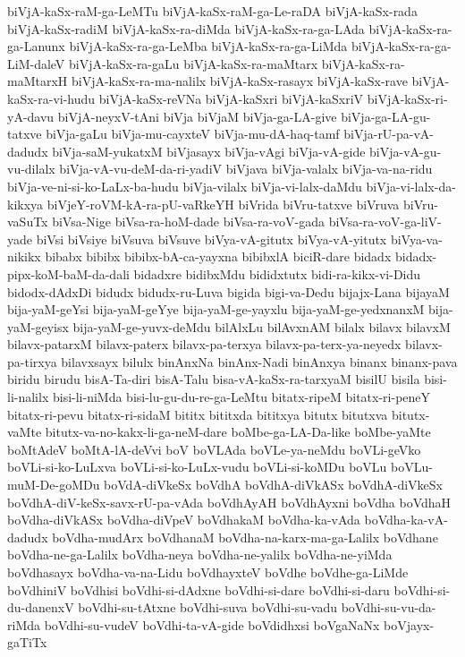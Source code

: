{biVjA-kaSx-raM-ga-LeMTu
biVjA-kaSx-raM-ga-Le-raDA
biVjA-kaSx-rada
biVjA-kaSx-radiM
biVjA-kaSx-ra-diMda
biVjA-kaSx-ra-ga-LAda
biVjA-kaSx-ra-ga-Lanunx
biVjA-kaSx-ra-ga-LeMba
biVjA-kaSx-ra-ga-LiMda
biVjA-kaSx-ra-ga-LiM-daleV
biVjA-kaSx-ra-gaLu
biVjA-kaSx-ra-maMtarx
biVjA-kaSx-ra-maMtarxH
biVjA-kaSx-ra-ma-nalilx
biVjA-kaSx-rasayx
biVjA-kaSx-rave
biVjA-kaSx-ra-vi-hudu
biVjA-kaSx-reVNa
biVjA-kaSxri
biVjA-kaSxriV
biVjA-kaSx-ri-yA-davu
biVjA-neyxV-tAni
biVja
biVjaM
biVja-ga-LA-give
biVja-ga-LA-gu-tatxve
biVja-gaLu
biVja-mu-cayxteV
biVja-mu-dA-haq-tamf
biVja-rU-pa-vA-dadudx
biVja-saM-yukatxM
biVjasayx
biVja-vAgi
biVja-vA-gide
biVja-vA-gu-vu-dilalx
biVja-vA-vu-deM-da-ri-yadiV
biVjava
biVja-valalx
biVja-va-na-ridu
biVja-ve-ni-si-ko-LaLx-ba-hudu
biVja-vilalx
biVja-vi-lalx-daMdu
biVja-vi-lalx-da-kikxya
biVjeY-roVM-kA-ra-pU-vaRkeYH
biVrida
biVru-tatxve
biVruva
biVru-vaSuTx
biVsa-Nige
biVsa-ra-hoM-dade
biVsa-ra-voV-gada
biVsa-ra-voV-ga-liV-yade
biVsi
biVsiye
biVsuva
biVsuve
biVya-vA-gitutx
biVya-vA-yitutx
biVya-va-nikikx
bibabx
bibibx
bibibx-bA-ca-yayxna
bibibxlA
biciR-dare
bidadx
bidadx-pipx-koM-baM-da-dali
bidadxre
bidibxMdu
bididxtutx
bidi-ra-kikx-vi-Didu
bidodx-dAdxDi
bidudx
bidudx-ru-Luva
bigida
bigi-va-Dedu
bijajx-Lana
bijayaM
bija-yaM-geYsi
bija-yaM-geYye
bija-yaM-ge-yayxlu
bija-yaM-ge-yedxnanxM
bija-yaM-geyisx
bija-yaM-ge-yuvx-deMdu
bilAlxLu
bilAvxnAM
bilalx
bilavx
bilavxM
bilavx-patarxM
bilavx-paterx
bilavx-pa-terxya
bilavx-pa-terx-ya-neyedx
bilavx-pa-tirxya
bilavxsayx
bilulx
binAnxNa
binAnx-Nadi
binAnxya
binanx
binanx-pava
biridu
birudu
bisA-Ta-diri
bisA-Talu
bisa-vA-kaSx-ra-tarxyaM
bisilU
bisila
bisi-li-nalilx
bisi-li-niMda
bisi-lu-gu-du-re-ga-LeMtu
bitatx-ripeM
bitatx-ri-peneY
bitatx-ri-pevu
bitatx-ri-sidaM
bititx
bititxda
bititxya
bitutx
bitutxva
bitutx-vaMte
bitutx-va-no-kakx-li-ga-neM-dare
boMbe-ga-LA-Da-like
boMbe-yaMte
boMtAdeV
boMtA-lA-deVvi
boV
boVLAda
boVLe-ya-neMdu
boVLi-geVko
boVLi-si-ko-LuLxva
boVLi-si-ko-LuLx-vudu
boVLi-si-koMDu
boVLu
boVLu-muM-De-goMDu
boVdA-diVkeSx
boVdhA
boVdhA-diVkASx
boVdhA-diVkeSx
boVdhA-diV-keSx-savx-rU-pa-vAda
boVdhAyAH
boVdhAyxni
boVdha
boVdhaH
boVdha-diVkASx
boVdha-diVpeV
boVdhakaM
boVdha-ka-vAda
boVdha-ka-vA-dadudx
boVdha-mudArx
boVdhanaM
boVdha-na-karx-ma-ga-Lalilx
boVdhane
boVdha-ne-ga-Lalilx
boVdha-neya
boVdha-ne-yalilx
boVdha-ne-yiMda
boVdhasayx
boVdha-va-na-Lidu
boVdhayxteV
boVdhe
boVdhe-ga-LiMde
boVdhiniV
boVdhisi
boVdhi-si-dAdxne
boVdhi-si-dare
boVdhi-si-daru
boVdhi-si-du-danenxV
boVdhi-su-tAtxne
boVdhi-suva
boVdhi-su-vadu
boVdhi-su-vu-da-riMda
boVdhi-su-vudeV
boVdhi-ta-vA-gide
boVdidhxsi
boVgaNaNx
boVjayx-gaTiTx
}
